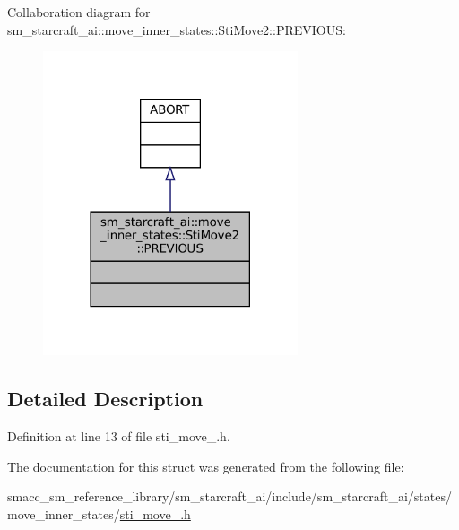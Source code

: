 Collaboration diagram for sm\+\_\+starcraft\+\_\+ai\+:\+:move\+\_\+inner\+\_\+states\+:\+:Sti\+Move2\+:\+:P\+R\+E\+V\+I\+O\+US\+:
\nopagebreak
\begin{figure}[H]
\begin{center}
\leavevmode
\includegraphics[width=213pt]{structsm__starcraft__ai_1_1move__inner__states_1_1StiMove2_1_1PREVIOUS__coll__graph}
\end{center}
\end{figure}


\subsection{Detailed Description}


Definition at line 13 of file sti\+\_\+move\+\_.\+h.



The documentation for this struct was generated from the following file\+:\begin{DoxyCompactItemize}
\item 
smacc\+\_\+sm\+\_\+reference\+\_\+library/sm\+\_\+starcraft\+\_\+ai/include/sm\+\_\+starcraft\+\_\+ai/states/move\+\_\+inner\+\_\+states/\hyperlink{sti__move__2_8h}{sti\+\_\+move\+\_.\+h}\end{DoxyCompactItemize}
